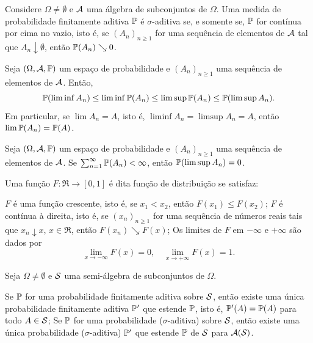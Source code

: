 \begin{theorem}
	Considere $\Omega \neq \emptyset$ e $\Acal$ uma álgebra de subconjuntos de $\Omega$. Uma medida de probabilidade finitamente aditiva $\P$ é $\sigma$-aditiva se, e somente se, $\P$ for contínua por cima no vazio, isto é, se $(A_n)_{n\geq 1}$ for uma sequência de elementos de $\Acal$ tal que $A_n \downarrow \emptyset$, então $\P(A_n) \searrow 0$.
\end{theorem}

\begin{theorem}
	Seja $(\Omega, \Acal, \P)$ um espaço de probabilidade e $(A_n)_{n\geq 1}$ uma sequência de elementos de $\Acal$. Então,
	\[
	\P(\liminf A_n) \leq \liminf \P(A_n) \leq \limsup \P(A_n) \leq \P(\limsup A_n).
	\]
	Em particular, se $\lim A_n = A$, isto é, $\liminf A_n = \limsup A_n = A$, então $\lim \P(A_n) = \P(A)$.
\end{theorem}

\begin{theorem}
	Seja $(\Omega, \Acal, \P)$ um espaço de probabilidade e $(A_n)_{n\geq 1}$ uma sequência de elementos de $\Acal$. Se $\sum_{n=1}^{\infty} \P(A_n) < \infty$, então $\P(\limsup A_n) = 0$.
\end{theorem}

\begin{definition}
	Uma função $F : \Re \to [0,1]$ é dita função de distribuição se satisfaz:
	\begin{outline}[enumerate]
		\1 $F$ é uma função crescente, isto é, se $x_1 < x_2$, então $F(x_1) \leq F(x_2)$;
		\1 $F$ é contínua à direita, isto é, se $(x_n)_{n\geq 1}$ for uma sequência de números reais tais que $x_n \downarrow x$, $x \in \Re$, então $F(x_n) \searrow F(x)$;
		\1 Os limites de $F$ em $-\infty$ e $+\infty$ são dados por
		\[
		\lim_{x \to -\infty} F(x) = 0, \quad \lim_{x \to +\infty} F(x) = 1.
		\]
	\end{outline}
\end{definition}

\begin{theorem}
	Seja $\Omega \neq \emptyset$ e $\Scal$ uma semi-álgebra de subconjuntos de $\Omega$.
	\begin{outline}[enumerate]
		\1 Se $\P$ for uma probabilidade finitamente aditiva sobre $\Scal$, então existe uma única probabilidade finitamente aditiva $\P'$ que estende $\P$, isto é, $\P'(A) = \P(A)$ para todo $A \in \Scal$;
		\1 Se $\P$ for uma probabilidade ($\sigma$-aditiva) sobre $\Scal$, então existe uma única probabilidade ($\sigma$-aditiva) $\P'$ que estende $\P$ de $\Scal$ para $\Acal(\Scal)$.
	\end{outline}
\end{theorem}

